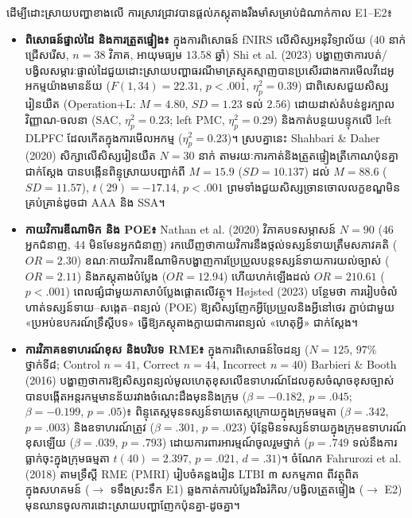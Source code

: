 \documentclass[a4paper,12pt]{article}
\newcommand{\en}[1]{{\TimesEn #1}}
\begin{document}
ដើម្បីដោះស្រាយបញ្ហាខាងលើ ការស្រាវជ្រាវបានផ្ដល់ភស្តុតាងរឹងមាំសម្រាប់ដំណាក់កាល \en{E1--E2}៖
\begin{itemize}[leftmargin=0.50cm, topsep=1pt, itemsep=1.5pt, parsep=0pt]
  \item \textbf{ពិសោធន៍ផ្ទាល់ដៃ និងការត្រួតផ្ទៀង៖} ក្នុងការពិសោធន៍ \en{fNIRS} លើសិស្សអនុវិទ្យាល័យ ($40$ នាក់ជ្រើសរើស, $n = 38$ វិភាគ, អាយុមធ្យម $13.58$ ឆ្នាំ) \en{Shi et al. (2023)} បង្ហាញថាការបត់/បង្វិលសម្ភារៈផ្ទាល់ដៃជួយដោះស្រាយបញ្ហាធរណីមាត្រស្មុគស្មាញបានប្រសើរជាងការមើលវីដេអូអកម្មយ៉ាងមានន័យ ($F(1, 34) = 22.31$, $p < .001$, $\eta^2_p = 0.39$) ជាពិសេសជួយសិស្សរៀនយឺត (\en{Operation+L}: $M = 4.80$, $SD = 1.23$ ទល់ $2.56$) ដោយដាស់តំបន់ខួរក្បាលវិញ្ញាណ-ចលនា (\en{SAC}, $\eta^2_p = 0.23$; \en{left PMC}, $\eta^2_p = 0.29$) និងកាត់បន្ថយបន្ទុកលើ \en{left DLPFC} ដែលកើតក្នុងការមើលអកម្ម ($\eta^2_p = 0.23$)។ ស្របគ្នានេះ \en{Shahbari \& Daher (2020)} សិក្សាលើសិស្សរៀនយឺត $N = 30$ នាក់ តាមរយៈការកាត់និងត្រួតផ្ទៀងត្រីកោណប៉ុនគ្នាជាក់ស្ដែង បានបង្កើនពិន្ទុស្រាយបញ្ជាក់ពី $M = 15.9$ ($SD = 10.137$) ដល់ $M = 88.6$ ($SD = 11.57$), $t(29) = -17.14$, $p < .001$ ព្រមទាំងជួយសិស្សច្រានចោលលក្ខខណ្ឌមិនគ្រប់គ្រាន់ដូចជា \en{AAA} និង \en{SSA}។
  \item \textbf{កាយវិការឌីណាមិក និង \en{POE}៖} \en{Nathan et al. (2020)} វិភាគបទសម្ភាសន៍ $N = 90$ ($46$ អ្នកជំនាញ, $44$ មិនមែនអ្នកជំនាញ) រកឃើញថាកាយវិការនឹងថ្កល់ទស្សន៍ទាយត្រឹមសភាវគតិ ($OR = 2.30$) ខណៈកាយវិការឌីណាមិកបង្ហាញការប្រែប្រួលបន្តទស្សន៍ទាយការយល់ច្បាស់ ($OR = 2.11$) និងភស្តុតាងបំប្លែង ($OR = 12.94$) ហើយហក់ឡើងដល់ $OR = 210.61$ ($p < .001$) ពេលផ្សំជាមួយភាសាបំប្លែងផ្ដោតលើវត្ថុ។ \en{H\o jsted (2023)} បន្ថែមថា ការរៀបចំលំហាត់ទស្សន៍ទាយ--សង្កេត--ពន្យល់ (\en{POE}) ឱ្យសិស្សញែកអ្វីប្រែប្រួលនិងអ្វីនៅថេរ ភ្ជាប់ជាមួយ «ប្រអប់ឧបករណ៍ទ្រឹស្ដីបទ» ធ្វើឱ្យភស្តុតាងក្លាយជាការពន្យល់ «ហេតុអ្វី» ជាក់ស្ដែង។
  \item \textbf{ការវិភាគឧទាហរណ៍ខុស និងបរិបទ \en{RME}៖} ក្នុងការពិសោធន៍ចៃដន្យ ($N = 125$, $97\%$ ថ្នាក់ទី៨; \en{Control} $n=41$, \en{Correct} $n=44$, \en{Incorrect} $n=40$) \en{Barbieri \& Booth (2016)} បង្ហាញថាការឱ្យសិស្សពន្យល់មូលហេតុខុសលើឧទាហរណ៍ដែលគូសចំណុចខុសច្បាស់ បានបង្កើតអន្តរកម្មមានន័យរវាងចំណេះដឹងមុននិងក្រុម ($\beta = -0.182$, $p = .045$; $\beta = -0.199$, $p = .05$)៖ ពិន្ទុតេស្តមុនទស្សន៍ទាយតេស្តក្រោយក្នុងក្រុមធម្មតា ($\beta = .342$, $p = .003$) និងឧទាហរណ៍ត្រូវ ($\beta = .301$, $p = .023$) ប៉ុន្តែមិនទស្សន៍ទាយក្នុងក្រុមឧទាហរណ៍ខុសឡើយ ($\beta = .039$, $p = .793$) ដោយការពារអារម្មណ៍ចូលរួមថ្នាក់ ($p = .749$ ទល់នឹងការធ្លាក់ចុះក្នុងក្រុមធម្មតា $t(40) = 2.397$, $p = .021$, $d = .31$)។ ចំណែក \en{Fahrurozi et al. (2018)} តាមទ្រឹស្ដី \en{RME (PMRI)} រៀបចំគន្លងរៀន \en{LTBI} ៣ សកម្មភាព ពីវត្ថុពិតក្នុងសហគមន៍ ($\to$ ទទឹងស្រះទឹក \en{E1}) ឆ្លងកាត់ការបំប្លែងរឹងរំកិល/បង្វិលត្រួតផ្ទៀង ($\to$ \en{E2}) មុនឈានចូលការដោះស្រាយបញ្ហាញែកប៉ុនគ្នា-ដូចគ្នា។
\end{itemize}
\end{document}
